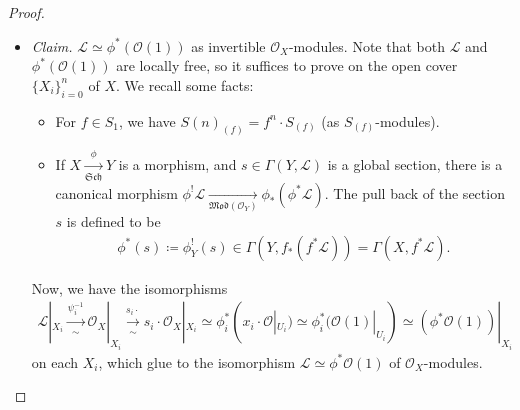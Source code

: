 \documentclass[11pt,a4paper,footinclude=true,headinclude=true]{scrbook} %
\DeclareMathOperator{\Spec}{Spec}
\newcommand{\LL}{\mathscr{L}}
\newcommand{\OO}{\mathcal{O}}
\newcommand{\Sch}{\mathfrak{Sch}}
\newcommand{\<}{\langle}
\newcommand{\>}{\rangle}
\newcommand{\MOD}{\mathfrak{Mod}}
\begin{document}
\begin{proof}
\begin{itemize}
\begin{itemize}
\begin{gather*}
                A[y_0,\cdots,y_n]_{y_j}\simeq A[x_0,\cdots,x_n]_{(x_ix_j)}\simeq A[y_0',\cdots,y_n']_{y_i'},\\
                U_{ij}=D_+(x_ix_j)\simeq\Spec A[x_0,\cdots,x_n]_{(x_ix_j)}.
            \end{gather*}
           We have the correspondence of morphisms and ring homomorphisms:
            \begin{center}
            \end{center}
            where the both restrictions $f_i|_j:\frac{y_k}{y_j}=\frac{x_ix_k}{x_ix_j}\mapsto\frac{s_is_k}{s_is_j}$ and $f_j|_i:\frac{y_l'}{y_i'}=\frac{x_lx_j}{x_ix_j}\mapsto\frac{s_ls_j}{s_is_j}$ are compatible with $f_{ij}:=\frac{x_kx_l}{x_ix_j}\mapsto=\frac{s_ks_l}{s_ix_j}$. So, $f_{ij}$ determines the middle morphism $U_{ij}\leftarrow X_{ij}$ uniquely, and hence, $\phi_i|_j=\phi_j|_i$.
        \end{itemize}
        \item \textit{Claim.} $\LL\simeq\phi^\ast(\OO(1))$ as invertible $\OO_X$-modules. Note that both $\LL$ and $\phi^\ast(\OO(1))$ are locally free, so it suffices to prove on the open cover $\{X_i\}_{i=0}^n$ of $X$. We recall some facts:
        \begin{itemize}
            \item For $f\in S_1$, we have $S(n)_{(f)}=f^n\cdot S_{(f)}$ (as $S_{(f)}$-modules).
            \item If $X\xrightarrow[\Sch]{\phi}Y$ is a morphism, and $s\in\Gamma(Y,\LL)$ is a global section, there is a canonical morphism $\phi^{!}\LL\xrightarrow[\MOD(\OO_Y)]{}\phi_\ast(\phi^\ast\LL)$. The pull back of the section $s$ is defined to be
            \begin{align*}
                \phi^\ast(s)\coloneqq\phi^{!}_Y(s)\in\Gamma(Y,f_\ast(f^\ast\LL))=\Gamma(X,f^\ast\LL).
            \end{align*}
        \end{itemize}
        Now, we have the isomorphisms
        \begin{align*}
            \LL|_{X_i}\xrightarrow[\sim]{\psi_i^{-1}}\OO_X|_{X_i}\xrightarrow[\sim]{s_i\cdot}s_i\cdot\OO_X|_{X_i}\simeq\phi_i^\ast(x_i\cdot\OO|_{U_i})\simeq\phi_i^\ast(\OO(1)|_{U_i})\simeq(\phi^\ast\OO(1))|_{X_i}
        \end{align*}
        on each $X_i$, which glue to the isomorphism $\LL\simeq\phi^\ast\OO(1)$ of $\OO_X$-modules.
        

\end{itemize}
\end{proof}
\end{document}
